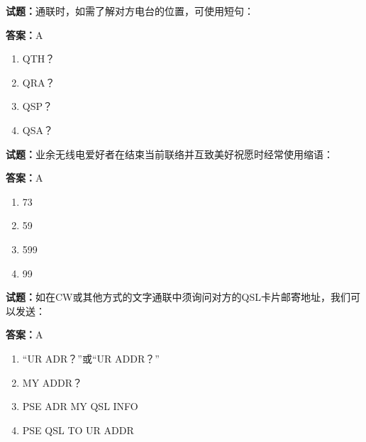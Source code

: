 \documentclass{ctexbook}
\begin{document}




\vspace{1em}

\textbf{试题：}通联时，如需了解对方电台的位置，可使用短句： 

\textbf{答案：}A 

\begin{enumerate}[leftmargin=3em]
  \item QTH？ 

  \item QRA？ 

  \item QSP？ 

  \item QSA？ 

\end{enumerate}





\vspace{1em}

\textbf{试题：}业余无线电爱好者在结束当前联络并互致美好祝愿时经常使用缩语： 

\textbf{答案：}A 

\begin{enumerate}[leftmargin=3em]
  \item 73 

  \item 59 

  \item 599 

  \item 99 

\end{enumerate}





\vspace{1em}

\textbf{试题：}如在CW或其他方式的文字通联中须询问对方的QSL卡片邮寄地址，我们可以发送： 

\textbf{答案：}A 

\begin{enumerate}[leftmargin=3em]
  \item “UR ADR？”或“UR ADDR？” 

  \item MY ADDR？ 


  \item PSE ADR MY QSL INFO 

  \item PSE QSL TO UR ADDR 

\end{enumerate}
\end{document}
